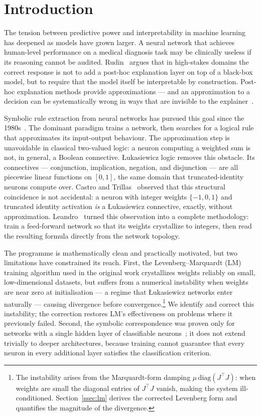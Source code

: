 \documentclass[lettersize,journal]{IEEEtran}
\begin{document}
\section{Introduction}
\label{sec:intro}

The tension between predictive power and interpretability in machine learning
has deepened as models have grown larger.
A neural network that achieves human-level performance on a medical diagnosis
task may be clinically useless if its reasoning cannot be audited.
Rudin~\cite{rudin2019} argues that in high-stakes domains the correct response
is not to add a post-hoc explanation layer on top of a black-box model, but to
require that the model itself be interpretable by construction.
Post-hoc explanation methods provide approximations --- and an approximation
to a decision can be systematically wrong in ways that are invisible to the
explainer~\cite{guidotti2018}.

Symbolic rule extraction from neural networks has pursued this goal since the
1980s~\cite{gallant1988,towell1993,towell1994}.
The dominant paradigm trains a network, then searches for a logical rule that
approximates its input-output behaviour.
The approximation step is unavoidable in classical two-valued logic: a neuron
computing a weighted sum is not, in general, a Boolean connective.
\L{}ukasiewicz logic removes this obstacle.
Its connectives --- conjunction, implication, negation, and disjunction ---
are all piecewise linear functions on $[0,1]$, the same domain that
truncated-identity neurons compute over.
Castro and Trillas~\cite{castro1998} observed that this structural coincidence
is not accidental: a neuron with integer weights $\{-1,0,1\}$ and truncated
identity activation \emph{is} a \L{}ukasiewicz connective, exactly, without
approximation.
Leandro~\cite{leandro2009} turned this observation into a complete
methodology: train a feed-forward network so that its weights crystallize to
integers, then read the resulting formula directly from the network topology.

The programme is mathematically clean and practically motivated, but two
limitations have constrained its reach.
First, the Levenberg--Marquardt (LM) training algorithm used in the original
work crystallizes weights reliably on small, low-dimensional datasets, but
suffers from a numerical instability when weights are near zero at
initialisation --- a regime that \L{}ukasiewicz networks enter naturally ---
causing divergence before convergence.\footnote{The instability arises from the
Marquardt-form damping $\mu\,\mathrm{diag}(J^\top J)$: when weights are small
the diagonal entries of $J^\top J$ vanish, making the system ill-conditioned.
Section~\ref{ssec:lm} derives the corrected Levenberg form and quantifies
the magnitude of the divergence.}
We identify and correct this instability; the correction restores LM's
effectiveness on problems where it previously failed.
Second, the symbolic correspondence was proven only for networks with a single
hidden layer of classifiable neurons~\cite{castro1998,leandro2009}; it does not
extend trivially to deeper architectures, because training cannot guarantee
that every neuron in every additional layer satisfies the classification
criterion.
\end{document}
